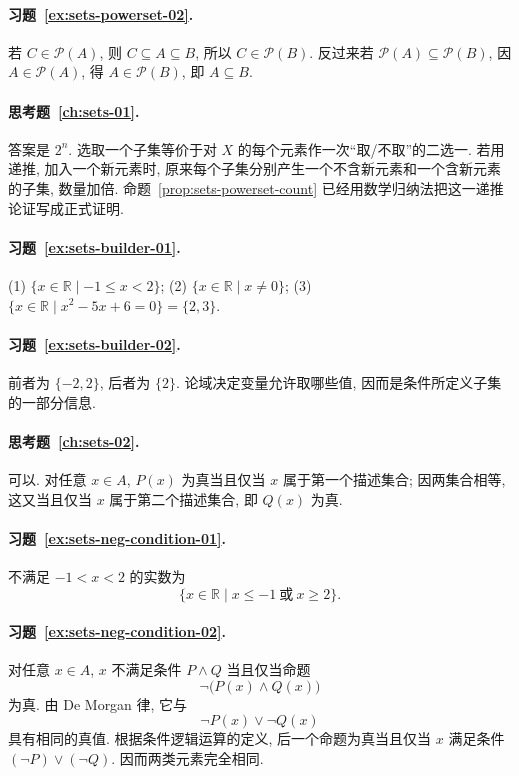 \documentclass[usesamecnt, thmcnt=section, lang=cn, newtx, 10pt, scheme=chinese]{elegantbook}
\begin{document}
\paragraph*{习题~\ref{ex:sets-powerset-02}.}
若 $C\in\mathscr P(A)$, 则 $C\subseteq A\subseteq B$, 所以 $C\in\mathscr P(B)$. 反过来若 $\mathscr P(A)\subseteq\mathscr P(B)$, 因 $A\in\mathscr P(A)$, 得 $A\in\mathscr P(B)$, 即 $A\subseteq B$.

\paragraph*{思考题~\ref{ch:sets-01}.}
答案是 $2^n$. 选取一个子集等价于对 $X$ 的每个元素作一次``取/不取''的二选一. 若用递推, 加入一个新元素时, 原来每个子集分别产生一个不含新元素和一个含新元素的子集, 数量加倍. 命题~\ref{prop:sets-powerset-count} 已经用数学归纳法把这一递推论证写成正式证明.

\paragraph*{习题~\ref{ex:sets-builder-01}.}
(1) $\{x\in\mathbb R\mid -1\leq x<2\}$; (2) $\{x\in\mathbb R\mid x\neq0\}$; (3) $\{x\in\mathbb R\mid x^2-5x+6=0\}=\{2,3\}$.

\paragraph*{习题~\ref{ex:sets-builder-02}.}
前者为 $\{-2,2\}$, 后者为 $\{2\}$. 论域决定变量允许取哪些值, 因而是条件所定义子集的一部分信息.

\paragraph*{思考题~\ref{ch:sets-02}.}
可以. 对任意 $x\in A$, $P(x)$ 为真当且仅当 $x$ 属于第一个描述集合; 因两集合相等, 这又当且仅当 $x$ 属于第二个描述集合, 即 $Q(x)$ 为真.

\paragraph*{习题~\ref{ex:sets-neg-condition-01}.}
不满足 $-1<x<2$ 的实数为
\[
 \{x\in\mathbb R\mid x\leq-1\ \text{或}\ x\geq2\}.
\]

\paragraph*{习题~\ref{ex:sets-neg-condition-02}.}
对任意 $x\in A$, $x$ 不满足条件 $P\wedge Q$ 当且仅当命题
\[
 \neg\bigl(P(x)\wedge Q(x)\bigr)
\]
为真. 由 De Morgan 律, 它与
\[
 \neg P(x)\vee\neg Q(x)
\]
具有相同的真值. 根据条件逻辑运算的定义, 后一个命题为真当且仅当 $x$ 满足条件 $(\neg P)\vee(\neg Q)$. 因而两类元素完全相同.
\end{document}
